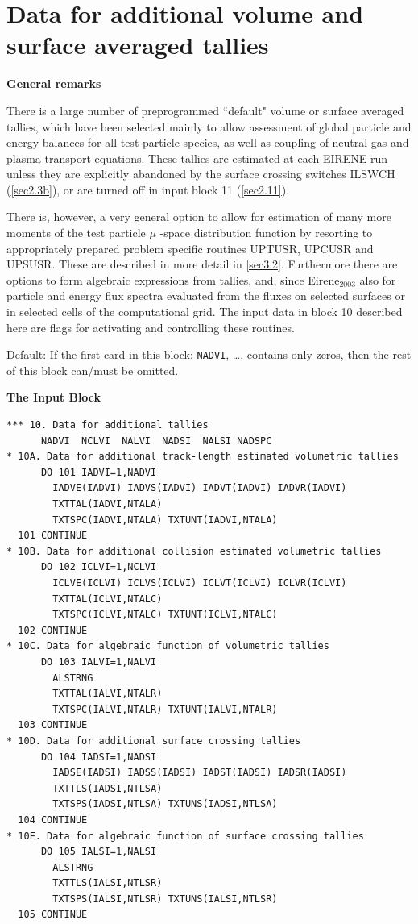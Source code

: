 \section{Data for additional volume and surface averaged tallies}
\label{sec2.10}

\textbf{General remarks}

\medskip

There is a large number of preprogrammed ``default" volume or surface averaged
tallies, which have been selected mainly to allow assessment of global particle
and energy balances for all test particle species, as well as coupling of
neutral gas and plasma transport equations.
These tallies are estimated at each EIRENE run unless they are explicitly
abandoned by the surface crossing switches ILSWCH (\cref{sec2.3b}), or are
turned off in input block 11 (\cref{sec2.11}).

There is, however, a very general option to allow for estimation of many more
moments of the test particle $\mu$ -space distribution function by resorting to
appropriately prepared problem specific routines UPTUSR, UPCUSR and UPSUSR.
These are described in more detail in \cref{sec3.2}.
Furthermore there are options to form algebraic expressions from tallies, and,
since Eirene$_{2003}$ also for particle and energy flux spectra evaluated from
the fluxes on selected surfaces or in selected cells of the computational grid.
The input data in block 10 described here are flags for activating and
controlling these routines.

Default: If the first card in this block: \lstinline|NADVI|, \dots,
contains only zeros, then the rest of this block can/must be omitted.

\medskip

\textbf{The Input Block}

\begin{small}
  \begin{lstlisting}
*** 10. Data for additional tallies
      NADVI  NCLVI  NALVI  NADSI  NALSI NADSPC
* 10A. Data for additional track-length estimated volumetric tallies
      DO 101 IADVI=1,NADVI
        IADVE(IADVI) IADVS(IADVI) IADVT(IADVI) IADVR(IADVI)
        TXTTAL(IADVI,NTALA)
        TXTSPC(IADVI,NTALA) TXTUNT(IADVI,NTALA)
  101 CONTINUE
* 10B. Data for additional collision estimated volumetric tallies
      DO 102 ICLVI=1,NCLVI
        ICLVE(ICLVI) ICLVS(ICLVI) ICLVT(ICLVI) ICLVR(ICLVI)
        TXTTAL(ICLVI,NTALC)
        TXTSPC(ICLVI,NTALC) TXTUNT(ICLVI,NTALC)
  102 CONTINUE
* 10C. Data for algebraic function of volumetric tallies
      DO 103 IALVI=1,NALVI
        ALSTRNG
        TXTTAL(IALVI,NTALR)
        TXTSPC(IALVI,NTALR) TXTUNT(IALVI,NTALR)
  103 CONTINUE
* 10D. Data for additional surface crossing tallies
      DO 104 IADSI=1,NADSI
        IADSE(IADSI) IADSS(IADSI) IADST(IADSI) IADSR(IADSI)
        TXTTLS(IADSI,NTLSA)
        TXTSPS(IADSI,NTLSA) TXTUNS(IADSI,NTLSA)
  104 CONTINUE
* 10E. Data for algebraic function of surface crossing tallies
      DO 105 IALSI=1,NALSI
        ALSTRNG
        TXTTLS(IALSI,NTLSR)
        TXTSPS(IALSI,NTLSR) TXTUNS(IALSI,NTLSR)
  105 CONTINUE
\end{lstlisting}
\end{small}

